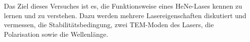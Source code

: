 
Das Ziel dieses Versuches ist es, die Funktionsweise eines HeNe-Lases kennen zu lernen und zu verstehen.
Dazu werden mehrere Lasereigenschaften diskutiert und vermessen, die Stabilitätsbedingung, zwei TEM-Moden des Lasers, die Polarisation sowie die Wellenlänge.
